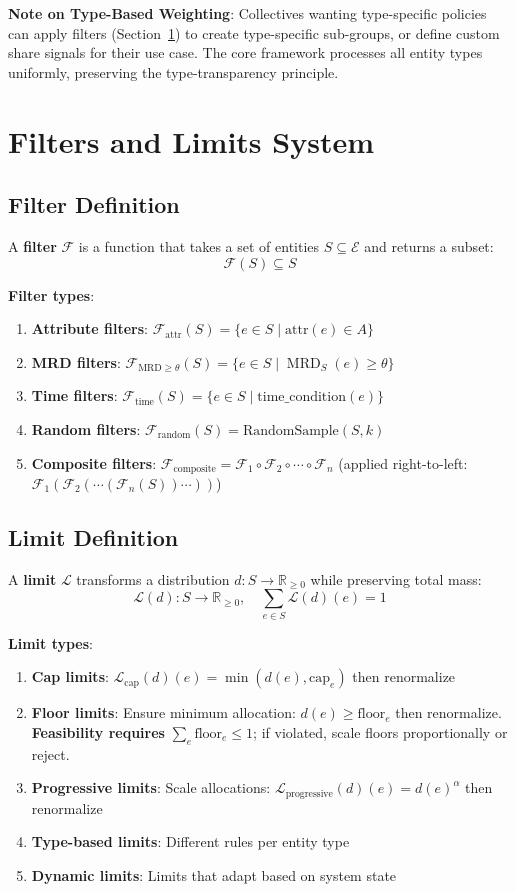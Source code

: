 \documentclass[11pt,a4paper]{article}
\theoremstyle{definition}
\theoremstyle{remark}
\newcommand{\E}{\mathcal{E}}
\newcommand{\F}{\mathcal{F}}
\DeclareMathOperator{\MRD}{MRD}
\begin{document}
\textbf{Note on Type-Based Weighting}: Collectives wanting type-specific policies can apply filters (Section~\ref{sec:filters}) to create type-specific sub-groups, or define custom share signals for their use case. The core framework processes all entity types uniformly, preserving the type-transparency principle.

\section{Filters and Limits System}
\label{sec:filters}

\subsection{Filter Definition}

A \textbf{filter} $\F$ is a function that takes a set of entities $S \subseteq \E$ and returns a subset:
\[ \F(S) \subseteq S \]

\textbf{Filter types}:
\begin{enumerate}
\item \textbf{Attribute filters}: $\F_{\text{attr}}(S) = \{ e \in S \mid \text{attr}(e) \in A \}$
\item \textbf{MRD filters}: $\F_{\text{MRD} \ge \theta}(S) = \{ e \in S \mid \MRD_S(e) \ge \theta \}$
\item \textbf{Time filters}: $\F_{\text{time}}(S) = \{ e \in S \mid \text{time\_condition}(e) \}$
\item \textbf{Random filters}: $\F_{\text{random}}(S) = \text{RandomSample}(S, k)$
\item \textbf{Composite filters}: $\F_{\text{composite}} = \F_1 \circ \F_2 \circ \cdots \circ \F_n$ (applied right-to-left: $\F_1(\F_2(\cdots(\F_n(S))\cdots))$)
\end{enumerate}

\subsection{Limit Definition}

A \textbf{limit} $\mathcal{L}$ transforms a distribution $d: S \rightarrow \mathbb{R}_{\ge 0}$ while preserving total mass:
\[ \mathcal{L}(d): S \rightarrow \mathbb{R}_{\ge 0}, \quad \sum_{e \in S} \mathcal{L}(d)(e) = 1 \]

\textbf{Limit types}:
\begin{enumerate}
\item \textbf{Cap limits}: $\mathcal{L}_{\text{cap}}(d)(e) = \min(d(e), \text{cap}_e)$ then renormalize
\item \textbf{Floor limits}: Ensure minimum allocation: $d(e) \ge \text{floor}_e$ then renormalize. \textbf{Feasibility requires} $\sum_e \text{floor}_e \le 1$; if violated, scale floors proportionally or reject.
\item \textbf{Progressive limits}: Scale allocations: $\mathcal{L}_{\text{progressive}}(d)(e) = d(e)^\alpha$ then renormalize
\item \textbf{Type-based limits}: Different rules per entity type
\item \textbf{Dynamic limits}: Limits that adapt based on system state
\end{enumerate}
\end{document}
